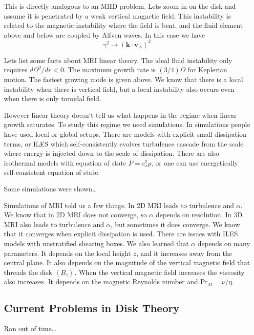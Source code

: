 \documentclass[letterpaper, 11pt]{article}
\numberwithin{equation}{section}
\numberwithin{figure}{section}
\begin{document}
This is directly analogous to an MHD problem. Lets zoom in on the disk and
assume it is penetrated by a weak vertical magnetic field. This instability is
related to the magnetic instability where the field is bent, and the fluid
element above and below are coupled by Alfven waves. In this case we have
\begin{equation}
  \label{eq:15}
  \gamma^2 \to (\mathbf{k}\cdot \mathbf{v}_A)^2
\end{equation}

Lets list some facts about MRI linear theory. The ideal fluid instability only
requires $d\Omega^2/dr < 0$. The maximum growth rate is $(3/4)\Omega$ for
Keplerian motion. The fastest growing mode is given above. We know that there is
a local instability when there is vertical field, but a local instability also
occurs even when there is only toroidal field.

However linear theory doesn't tell us what happens in the regime when linear
growth saturates. To study this regime we need simulations. In simulations
people have used local or global setups. There are models with explicit small
dissipation terms, or ILES which self-consistently evolves turbulence cascade
from the scale where energy is injected down to the scale of dissipation. There
are also isothermal models with equation of state $P = c_s^2\rho$, or one can
use energetically self-consistent equation of state.

Some simulations were shown\dots

Simulations of MRI told us a few things. In 2D MRI leads to turbulence and
$\alpha$. We know that in 2D MRI does not converge, so $\alpha$ depends on
resolution. In 3D MRI also leads to turbulence and $\alpha$, but sometimes it
does converge. We know that it converges when explicit dissipation is used.
There are issues with ILES models with unstratified shearing boxes. We also
learned that $\alpha$ depends on many parameters. It depends on the local height
$z$, and it increases away from the central plane. It also depends on the
magnitude of the vertical magnetic field that threads the disk $\left<
  B_z\right>$. When the vertical magnetic field increases the viscosity also
increases. It depends on the magnetic Reynolds number and $\mathrm{Pr}_{M} =
\nu/\eta$.

\subsection{Current Problems in Disk Theory}

Ran out of time\dots
\end{document}
